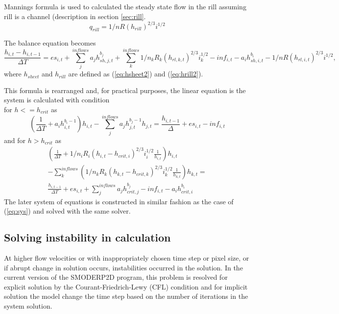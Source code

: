         Mannings formula is used to calculated the steady state flow in
        the rill assuming rill is a channel (description in section \ref{sec:rill}.  
        $$
        q_{rill} = 1/n R(h_{rill})^{2/3} i^{1/2}
        $$


        The balance equation becomes
        \begin{dmath}
          \frac{h_{i,t} - h_{i,t-1} }{\Delta T} = 
          es_{i,t} + \sum_j^{inflows} a_jh^{b_{j}}_{sh,j,t}  + \sum_k^{inflows} 1/n_k R_k(h_{rl,k,t})^{2/3} i_k^{1/2} - inf_{i,t} - a_ih^{b_{i}}_{sh,i,t} - 1/n R(h_{rl,i,t})^{2/3} i^{1/2},
        \end{dmath}
        where $h_{sheet}$ and $h_{rill}$ are defined as (\ref{eq:hsheet2}) and  (\ref{eq:hrill2}).

        This formula is rearranged and, for practical purposes, the linear equation is the system is calculated with condition \\
        for  $h<=h_{crit}$ as
        \begin{equation}
            \left(\frac{1}{\Delta T}+a_ih^{b_{i}-1}_{i,t}\right)h_{i,t} -  \sum_j^{inflows} a_jh^{b_{j}-1}_{j,t} h_{j,t} = \frac{h_{i,t-1}}{\Delta} +  es_{i,t} - inf_{i,t}
        \end{equation}
        and for  $h>h_{crit}$ as
        \begin{multline}
          \left(\frac{1}{\Delta T}
          + 1/n_i R_i(h_{i,t}-h_{crit,i})^{2/3} i_i^{1/2} \frac{1}{h_{i,t}}\right)h_{i,t} \\
            - \sum_k^{inflows} \left( 1/n_k R_k(h_{k,t}-h_{crit,k})^{2/3} i_k^{1/2}  \frac{1}{h_{k,t}}\right)h_{k,t}
          =  \\
          \frac{h_{i,t-1} }{\Delta T}
          + es_{i,t} 
          + \sum_j^{inflows} a_j h^{b_{j}}_{crit,j}  
          - inf_{i,t} 
          - a_i h^{b_{i}}_{crit,i} 
        \end{multline}
    The later system of equations is constructed in similar fashion as the case of (\ref{eq:sys}) and solved with the same solver.



    \subsection{Solving instability in calculation} 

    At higher flow velocities or with inappropriately chosen time step or pixel
    size, or if abrupt change in solution occurs,  instabilities occurred in
    the solution. In the current version of the SMODERP2D program, this problem
    is resolved for explicit solution by the Courant-Friedrich-Lewy (CFL)
    condition and for implicit solution the model change the time step based on
    the number of iterations in the system solution. 


